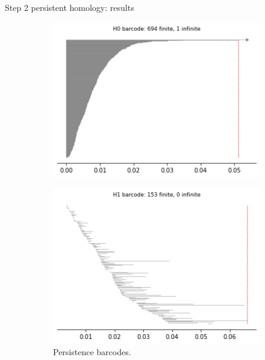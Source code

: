 \documentclass[xcolor={dvipsnames,svgnames}]{beamer}
\begin{document}
\begin{frame}{Step 2 persistent homology: results}
\begin{figure}[H]
\begin{subfigure}[b]{0.25\textwidth}
\end{subfigure}
\begin{subfigure}[b]{0.2\textwidth}
    \includegraphics[width=\textwidth]{figures/X6_H0_barcode.png}
    \caption{}
\end{subfigure}
\begin{subfigure}[b]{0.2\textwidth}
    \includegraphics[width=\textwidth]{figures/X6_H1_barcode.png}
        \caption{Persistence barcodes.}
\end{subfigure}
\begin{subfigure}[b]{0.2\textwidth}

\end{subfigure}
\end{figure}
\end{frame}
\end{document}
